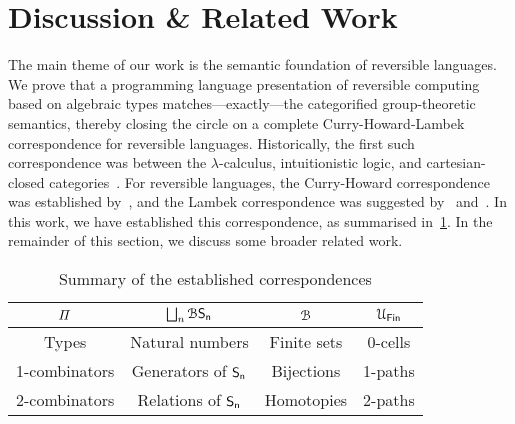 \section{Discussion \& Related Work}
\label{sec:discussion}


The main theme of our work is the semantic foundation of reversible languages. We prove that a programming language
presentation of reversible computing based on algebraic types matches---exactly---the categorified group-theoretic
semantics, thereby closing the circle on a complete Curry-Howard-Lambek correspondence for reversible languages.
Historically, the first such correspondence was between the $\lambda$-calculus, intuitionistic logic, and
cartesian-closed categories~\cite{curryCurryEssaysCombinatory1980}. For reversible languages, the Curry-Howard
correspondence was established by~\citet{sparksSuperstructuralReversibleLogic2014}, and the Lambek correspondence was
suggested by~\citet{caretteComputingSemiringsWeak2016} and~\citet{caretteEmbracingLawsPhysics2021}. In this work, we
have established this correspondence, as summarised in~\cref{fig:table-summary}. In the remainder of this section, we
discuss some broader related work.

\begin{table}
    \caption{Summary of the established correspondences}
    \begin{center}
        \begin{tabular}{cccc}
            \hline
            $\mathit{\Pi}$     & $\bigsqcup_n \mathcal{B}\Sn $ & $\BFin$     & $\UFin$ \tabularnewline
            \hline\hline
            Types         & Natural numbers               & Finite sets & 0-cells \tabularnewline
            1-combinators & Generators of $\Sn$           & Bijections  & 1-paths \tabularnewline
            2-combinators & Relations of $\Sn$            & Homotopies  & 2-paths \tabularnewline
            \hline
        \end{tabular}
    \end{center}
    \label{fig:table-summary}
\end{table}


